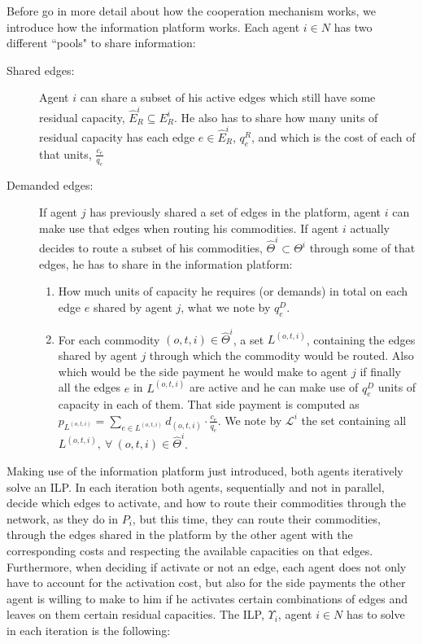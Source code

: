 \documentclass[review]{elsarticle}
\begin{document}
Before go in more detail about how the cooperation mechanism works, we introduce how the information platform works. Each agent $i\in N$ has two different ``pools" to share information:

\begin{description}
	\item[Shared edges:] Agent $i$ can share a subset of his active edges which still have some residual capacity, $\widehat{E}_R^i\subseteq E_R^i$. He also has to share how many units of residual capacity has each edge $e\in \widehat{E}_R^i$, $q_e^R$, and which is the cost of each of that units, $\frac{c_e}{q_e}$
	\item[Demanded edges:] If agent $j$ has previously shared a set of edges in the platform, agent $i$ can make use that edges when routing his commodities. If agent $i$ actually decides to route a subset of his commodities, $\widehat{\Theta}^i\subset \Theta ^i$ through some of that edges, he has to share in the information platform:
	\begin{enumerate}
		\item How much units of capacity he requires (or demands) in total on each edge $e$ shared by agent $j$, what we note by $q_e^D$.
	\item For each commodity $(o,t,i)\in \widehat{\Theta}^i$, a set $L^{(o,t,i)}$, containing the edges shared by agent $j$ through which the commodity would be routed. Also which would be the side payment he would make to agent $j$ if finally all the edges $e$ in $L^{(o,t,i)}$ are active and he can make use of $q_e^D$ units of capacity in each of them. That side payment is computed as $p_{L^{(o,t,i)}}=\sum_{e \in L^{(o,t,i)}} d_{(o,t,i)}\cdot \frac{c_e}{q_e}$. We note by $\mathcal{L}^i$ the set containing all $L^{(o,t,i)},\ \forall\ (o,t,i) \in \widehat{\Theta}^i$.
	\end{enumerate}
		
\end{description}	

Making use of the information platform just introduced, both agents iteratively solve an ILP. In each iteration both agents, sequentially and not in parallel, decide which edges to activate, and how to route their commodities through the network, as they do in $P_i$, but this time, they can route their commodities, through the edges shared in the platform by the other agent with the corresponding costs and respecting the available capacities on that edges. Furthermore, when deciding if activate or not an edge, each agent does not only have to account for the activation cost, but also for the side payments the other agent is willing to make to him if he activates certain combinations of edges and leaves on them certain residual capacities. The ILP, $\Upsilon_i$, agent $i\in N$ has to solve in each iteration is the following:
\end{document}
